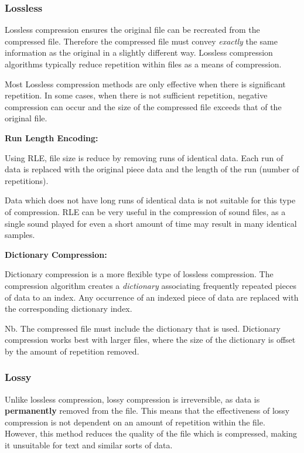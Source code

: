 \documentclass[9pt]{article}
\begin{document}
\subsubsection{Lossless}
\label{sec:org46fd253}

Lossless compression ensures the original file can be recreated from the compressed file. Therefore the compressed file must convey \emph{exactly} the same information as the original in a slightly different way. Lossless compression algorithms typically reduce repetition within files as a means of compression.

Most Lossless compression methods are only effective when there is significant repetition. In some cases, when there is not sufficient repetition, negative compression can occur and the size of the compressed file exceeds that of the original file.

\textbf{Run Length Encoding:}

Using RLE, file size is reduce by removing runs of identical data. Each run of data is replaced with the original piece data and the length of the run (number of repetitions).

Data which does not have long runs of identical data is not suitable for this type of compression. RLE can be very useful in the compression of sound files, as a single sound played for even a short amount of time may result in many identical samples.

\textbf{Dictionary Compression:}

Dictionary compression is a more flexible type of lossless compression. The compression algorithm creates a \emph{dictionary} associating frequently repeated pieces of data to an index. Any occurrence of an indexed piece of data are replaced with the corresponding dictionary index.

Nb. The compressed file must include the dictionary that is used. Dictionary compression works best with larger files, where the size of the dictionary is offset by the amount of repetition removed.

\subsubsection{Lossy}
\label{sec:org0d9eb72}

Unlike lossless compression, lossy compression is irreversible, as data is \textbf{permanently} removed from the file. This means that the effectiveness of lossy compression is not dependent on an amount of repetition within the file. However, this method reduces the quality of the file which is compressed, making it unsuitable for text and similar sorts of data.
\end{document}
